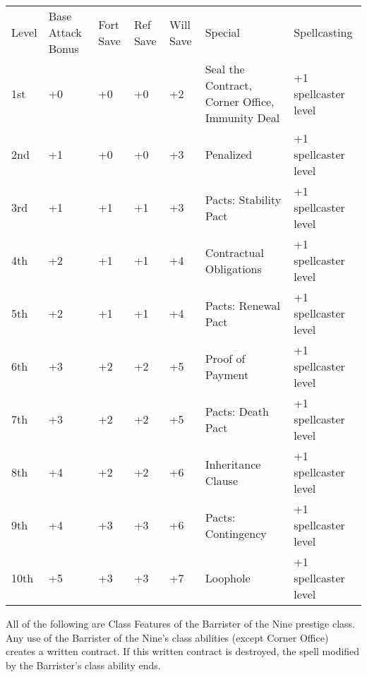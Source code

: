 \begin{table}[tbh]
\begin{small}
\begin{tabular}{lp{1.9cm}p{0.7cm}p{0.7cm}p{0.7cm}p{6cm}l}
Level  &Base Attack Bonus &Fort Save &Ref Save &Will Save &Special &Spellcasting\\
1st &+0 &+0 &+0 &+2 &Seal the Contract, Corner Office, Immunity Deal &+1 spellcaster level\\
2nd &+1 &+0 &+0 &+3 &Penalized &+1 spellcaster level\\
3rd &+1 &+1 &+1 &+3 &Pacts: Stability Pact &+1 spellcaster level\\
4th &+2 &+1 &+1 &+4 &Contractual Obligations &+1 spellcaster level\\
5th &+2 &+1 &+1 &+4 &Pacts: Renewal Pact &+1 spellcaster level\\
6th &+3 &+2 &+2 &+5 &Proof of Payment &+1 spellcaster level\\
7th &+3 &+2 &+2 &+5 &Pacts: Death Pact &+1 spellcaster level\\
8th &+4 &+2 &+2 &+6 &Inheritance Clause &+1 spellcaster level\\
9th &+4 &+3 &+3 &+6 &Pacts: Contingency &+1 spellcaster level\\
10th &+5 &+3 &+3 &+7 &Loophole &+1 spellcaster level\\
\end{tabular}
\end{small}
\end{table}


\smallskip\noindent All of the following are Class Features of the Barrister of the Nine prestige class. Any use of the Barrister of the Nine's class abilities (except Corner Office) creates a written contract. If this written contract is destroyed, the spell modified by the Barrister's class ability ends.




